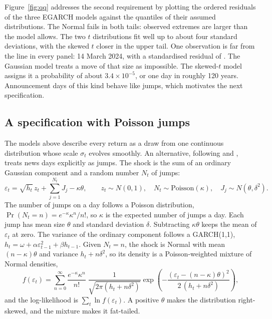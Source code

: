 \documentclass[11pt,a4paper]{article}
\begin{document}
Figure~\ref{fig:qq} addresses the second requirement by plotting the ordered residuals of the three EGARCH models against the quantiles of their assumed distributions. The Normal fails in both tails: observed extremes are larger than the model allows. The two $t$ distributions fit well up to about four standard deviations, with the skewed $t$ closer in the upper tail. One observation is far from the line in every panel: 14 March 2024, with a standardised residual of \esZmax. The Gaussian model treats a move of that size as impossible. The skewed-$t$ model assigns it a probability of about $3.4\times10^{-5}$, or one day in roughly 120 years. Announcement days of this kind behave like jumps, which motivates the next specification.

\subsection{A specification with Poisson jumps}\label{sec:jump}

The models above describe every return as a draw from one continuous distribution whose scale $\sigma_t$ evolves smoothly. An alternative, following \citet{merton1976} and \citet{jorion1988}, treats news days explicitly as jumps. The shock is the sum of an ordinary Gaussian component and a random number $N_t$ of jumps:
\begin{equation}\label{eq:jump}
\varepsilon_t=\sqrt{h_t}\,z_t+\sum_{j=1}^{N_t}J_{j}-\kappa\theta,\qquad z_t\sim N(0,1),\quad N_t\sim\text{Poisson}(\kappa),\quad J_{j}\sim N(\theta,\delta^{2}).
\end{equation}
The number of jumps on a day follows a Poisson distribution, $\Pr(N_t=n)=e^{-\kappa}\kappa^{n}/n!$, so $\kappa$ is the expected number of jumps a day. Each jump has mean size $\theta$ and standard deviation $\delta$. Subtracting $\kappa\theta$ keeps the mean of $\varepsilon_t$ at zero. The variance of the ordinary component follows a GARCH(1,1), $h_t=\omega+\alpha\varepsilon_{t-1}^2+\beta h_{t-1}$. Given $N_t=n$, the shock is Normal with mean $(n-\kappa)\theta$ and variance $h_t+n\delta^2$, so its density is a Poisson-weighted mixture of Normal densities,
\begin{equation}\label{eq:jumpdens}
f(\varepsilon_t)=\sum_{n=0}^{\infty}\frac{e^{-\kappa}\kappa^{n}}{n!}\;\frac{1}{\sqrt{2\pi(h_t+n\delta^{2})}}\exp\!\left(-\frac{\left(\varepsilon_t-(n-\kappa)\theta\right)^{2}}{2\,(h_t+n\delta^{2})}\right),
\end{equation}
and the log-likelihood is $\sum_t\ln f(\varepsilon_t)$. A positive $\theta$ makes the distribution right-skewed, and the mixture makes it fat-tailed.
\end{document}
